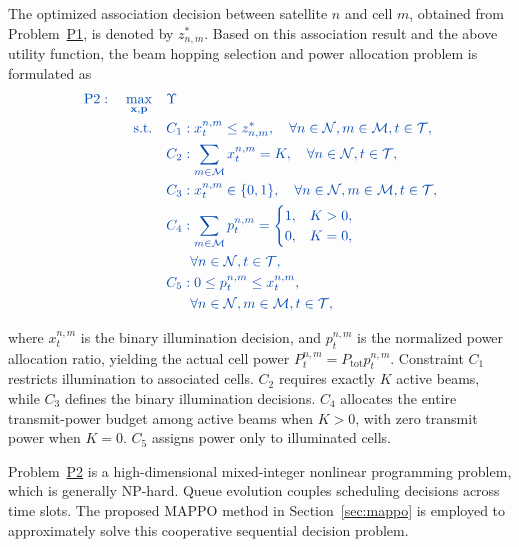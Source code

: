 \documentclass[journal]{IEEEtran}
\newcommand{\revbegin}[1]{\color{revisionblue}\ignorespaces}
\newcommand{\revend}[1]{\color{black}\ignorespaces}
\begin{document}
The optimized association decision between satellite $n$ and cell $m$, obtained from Problem~\hyperref[prob:p1]{P1}, is denoted by $z_{n,m}^*$. Based on this association result and the above utility function, the beam hopping selection and power allocation problem is formulated as
\begin{equation}\color{revisionblue}
\label{prob:p2}
\begin{aligned}
\mathrm{P2}:\quad
\max_{\mathbf{x},\mathbf{p}}\quad
& \Upsilon \\
\mathrm{s.t.}\quad
& C_1:x_t^{n,m}\leq z_{n,m}^*,\quad \forall n\in\mathcal{N},m\in\mathcal{M},t\in\mathcal{T},\\
& C_2:\sum_{m\in\mathcal{M}}x_t^{n,m}=K,\quad \forall n\in\mathcal{N},t\in\mathcal{T},\\
& C_3:x_t^{n,m}\in\{0,1\},\quad \forall n\in\mathcal{N},m\in\mathcal{M},t\in\mathcal{T},\\
& C_4:\sum_{m\in\mathcal{M}}p_t^{n,m}=
\begin{cases}
1,&K>0,\\
0,&K=0,
\end{cases}\\
& \hphantom{C_4:}\forall n\in\mathcal{N},t\in\mathcal{T},\\
& C_5:0\leq p_t^{n,m}\leq x_t^{n,m},\\
& \hphantom{C_5:}\forall n\in\mathcal{N},m\in\mathcal{M},t\in\mathcal{T},
\end{aligned}
\end{equation}

\revbegin{}where $x_t^{n,m}$ is the binary illumination decision, and $p_t^{n,m}$ is the normalized power allocation ratio, yielding the actual cell power $P_t^{n,m}=P_{\mathrm{tot}}p_t^{n,m}$. Constraint $C_1$ restricts illumination to associated cells. $C_2$ requires exactly $K$ active beams, while $C_3$ defines the binary illumination decisions. $C_4$ allocates the entire transmit-power budget among active beams when $K>0$, with zero transmit power when $K=0$. $C_5$ assigns power only to illuminated cells.\revend{}

\revbegin{}Problem~\hyperref[prob:p2]{P2} is a high-dimensional mixed-integer nonlinear programming problem, which is generally NP-hard. Queue evolution couples scheduling decisions across time slots. The proposed MAPPO method in Section~\ref{sec:mappo} is employed to approximately solve this cooperative sequential decision problem.\revend{}
\end{document}
